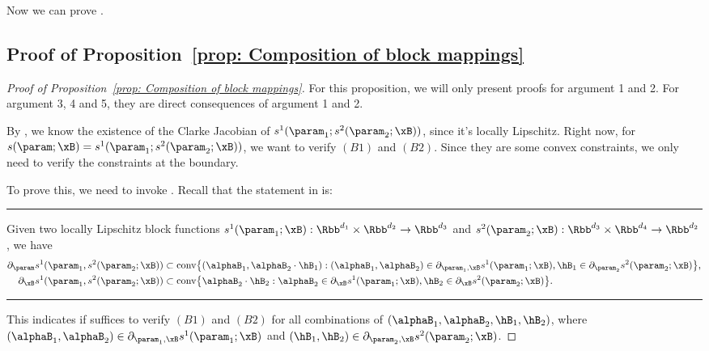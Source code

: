 Now we can prove . 


\subsection{Proof of Proposition~\ref{prop: Composition of block mappings}} 
\label{sec:proof:42}
\begin{proof}[Proof of Proposition~\ref{prop: Composition of block mappings}]

For this proposition, we will only present proofs for argument 1 and 2. For argument 3, 4 and 5, they are direct consequences of argument 1 and 2. 


By , we know the existence of the Clarke Jacobian of $s^1(\param_1; s^2(\param_2;\xB))$, since it's locally Lipschitz. Right now, for $s(\param;\xB) = s^1(\param_1; s^2(\param_2;\xB))$, we want to verify $(B1)$ and $(B2)$. Since they are some convex constraints, we only need to verify the constraints at the boundary. 

To prove this, we need to invoke .  Recall that the statement in  is: 

\vspace{1em}
\hrule 
\vspace{1em}


Given two locally Lipschitz block functions 
$s^1(\param_1; \xB): \Rbb^{d_1} \times \Rbb^{d_2} \to \Rbb^{d_3}$ and $s^2(\param_2; \xB): \Rbb^{d_3} \times \Rbb^{d_4} \to \Rbb^{d_2}$, 
we have 
\begin{align*}
\partial_{\param} s^1(\param_1, s^2(\param_2;\xB)) 
&\subset \text{conv} \big\{ (\alphaB_1, \alphaB_2 \cdot\hB_1) : (\alphaB_1, \alphaB_2) \in \partial_{\param_1, \xB} s^1 (\param_1;\xB), \hB_1 \in \partial_{\param_2} s^2(\param_2;\xB)  \big\},\\   
\partial_{\xB} s^1(\param_1, s^2(\param_2;\xB)) 
&\subset \text{conv} \big\{ \alphaB_2 \cdot\hB_2 :  \alphaB_2 \in \partial_{\xB} s^1 (\param_1;\xB), \hB_2 \in \partial_{\xB} s^2(\param_2;\xB)  \big\}.  
\end{align*} 

\hrule 
\vspace{1em}

This indicates if suffices to verify $(B1)$ and $(B2)$ for all combinations of $(\alphaB_1, \alphaB_2, \hB_1, \hB_2)$, where $(\alphaB_1, \alphaB_2) \in \partial_{\param_1, \xB} s^1 (\param_1;\xB)$ and $(\hB_1,\hB_2)\in \partial_{\param_2, \xB} s^2(\param_2;\xB)$.


\end{proof}
